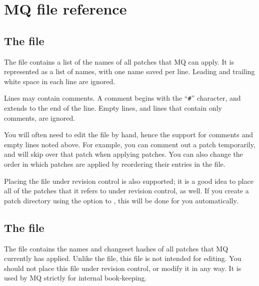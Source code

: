 \section{MQ file reference}

\subsection{The  file}

The  file contains a list of the names of all
patches that MQ can apply.  It is represented as a list of names, with
one name saved per line.  Leading and trailing white space in each
line are ignored.

Lines may contain comments.  A comment begins with the ``\texttt{\#}''
character, and extends to the end of the line.  Empty lines, and lines
that contain only comments, are ignored.

You will often need to edit the  file by hand, hence
the support for comments and empty lines noted above.  For example,
you can comment out a patch temporarily, and  will skip
over that patch when applying patches.  You can also change the order
in which patches are applied by reordering their entries in the
 file.

Placing the  file under revision control is also
supported; it is a good idea to place all of the patches that it
refers to under revision control, as well.  If you create a patch
directory using the  option to , this
will be done for you automatically.

\subsection{The  file}

The  file contains the names and changeset hashes of
all patches that MQ currently has applied.  Unlike the
 file, this file is not intended for editing.  You
should not place this file under revision control, or modify it in any
way.  It is used by MQ strictly for internal book-keeping.

